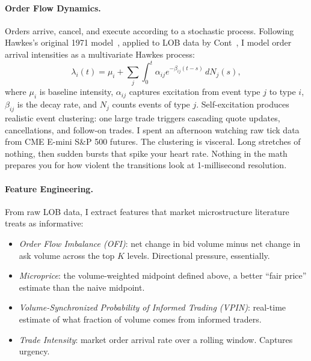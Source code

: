 \documentclass[11pt]{article}
\theoremstyle{definition}
\theoremstyle{remark}
\begin{document}
\paragraph{Order Flow Dynamics.}
Orders arrive, cancel, and execute according to a stochastic process.
Following Hawkes's original 1971 model~\citep{hawkes1971spectra}, applied to LOB data by Cont~\citep{cont2011statistical}, I model order arrival intensities as a multivariate Hawkes process:
\[
    \lambda_i(t) = \mu_i + \sum_j \int_0^t \alpha_{ij} e^{-\beta_{ij}(t-s)} \, dN_j(s),
\]
where $\mu_i$ is baseline intensity, $\alpha_{ij}$ captures excitation from event type $j$ to type $i$, $\beta_{ij}$ is the decay rate, and $N_j$ counts events of type $j$.
Self-excitation produces realistic event clustering: one large trade triggers cascading quote updates, cancellations, and follow-on trades.
I spent an afternoon watching raw tick data from CME E-mini S\&P 500 futures.
The clustering is visceral.
Long stretches of nothing, then sudden bursts that spike your heart rate.
Nothing in the math prepares you for how violent the transitions look at 1-millisecond resolution.

\paragraph{Feature Engineering.}
From raw LOB data, I extract features that market microstructure literature treats as informative:
\begin{itemize}
    \item \emph{Order Flow Imbalance (OFI)}: net change in bid volume minus net change in ask volume across the top $K$ levels.
    Directional pressure, essentially.
    \item \emph{Microprice}: the volume-weighted midpoint defined above, a better ``fair price'' estimate than the naive midpoint.
    \item \emph{Volume-Synchronized Probability of Informed Trading (VPIN)}: real-time estimate of what fraction of volume comes from informed traders.
    \item \emph{Trade Intensity}: market order arrival rate over a rolling window.
    Captures urgency.
\end{itemize}
\end{document}
